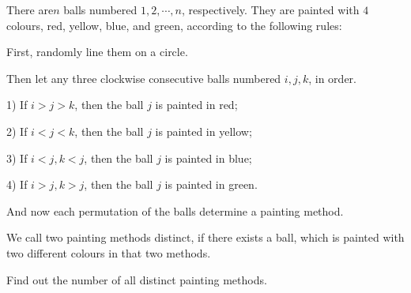 There are$n$ balls numbered $1,2,\cdots,n$,  respectively. They are painted with $4$ colours, red, yellow, blue, and green, according to the following rules:

First, randomly line them on a circle.

Then let any three clockwise consecutive balls numbered $i, j, k$,  in order.

1) If $i>j>k$,  then the ball $j$ is painted in red;

2) If $i<j<k$,  then the ball $j$ is painted in yellow;

3) If $i<j, k<j$,  then the ball $j$ is painted in blue;

4) If $i>j, k>j$,  then the ball $j$ is painted in green.

And now each permutation of the balls determine a painting method.

We call two painting methods distinct, if there exists a ball, which is painted with two different colours in that two methods.

Find out the number of all distinct painting methods.